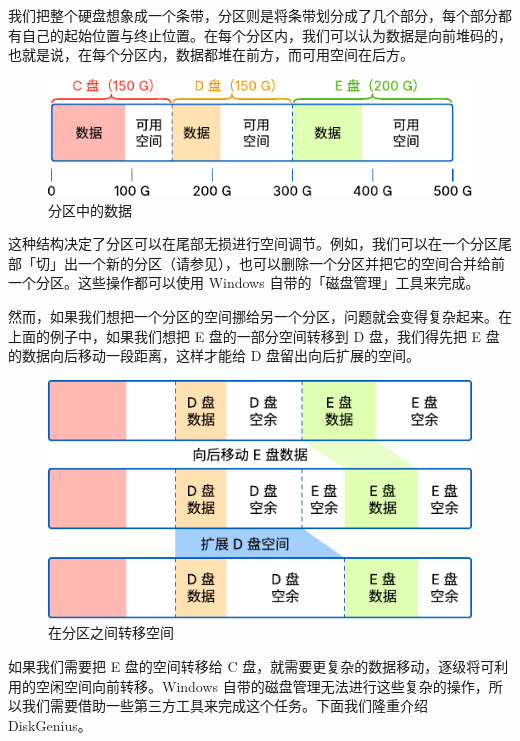 {我们把整个硬盘想象成一个条带，分区则是将条带划分成了几个部分，每个部分都有自己的起始位置与终止位置。在每个分区内，我们可以认为数据是向前堆码的，也就是说，在每个分区内，数据都堆在前方，而可用空间在后方。

\begin{figure}[htb!]
  \centering
  \includegraphics[width=.9\textwidth]{assets/advanced/Disk_partitions.pdf}
  \caption{分区中的数据}
  \label{fig:Disk_partitions}
\end{figure}

这种结构决定了分区可以在尾部无损进行空间调节。例如，我们可以在一个分区尾部「切」出一个新的分区（请参见），也可以删除一个分区并把它的空间合并给前一个分区。这些操作都可以使用 Windows 自带的「磁盘管理」工具来完成。

然而，如果我们想把一个分区的空间挪给另一个分区，问题就会变得复杂起来。在上面的例子中，如果我们想把 E 盘的一部分空间转移到 D 盘，我们得先把 E 盘的数据向后移动一段距离，这样才能给 D 盘留出向后扩展的空间。

\begin{figure}[htb!]
  \centering
  \includegraphics[width=.85\textwidth]{assets/advanced/Move_space_from_partition_to_partition.pdf}
  \caption{在分区之间转移空间}
  \label{fig:Move_space_from_partition_to_partition}
\end{figure}

如果我们需要把 E 盘的空间转移给 C 盘，就需要更复杂的数据移动，逐级将可利用的空闲空间向前转移。Windows 自带的磁盘管理无法进行这些复杂的操作，所以我们需要借助一些第三方工具来完成这个任务。下面我们隆重介绍 DiskGenius。

}

